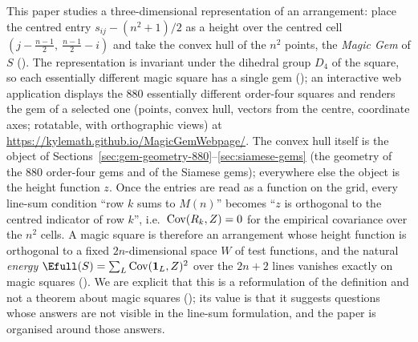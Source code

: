 This paper studies a three-dimensional representation of an arrangement: place the centred entry $s_{ij}-(n^2+1)/2$ as a height over the centred cell $(j-\frac{n-1}2,\ \frac{n-1}2-i)$ and take the convex hull of the $n^2$ points, the \emph{Magic Gem} of $S$ ().
The representation is invariant under the dihedral group $D_4$ of the square, so each essentially different magic square has a single gem (); an interactive web application displays the $880$ essentially different order-four squares and renders the gem of a selected one (points, convex hull, vectors from the centre, coordinate axes; rotatable, with orthographic views) at \url{https://kylemath.github.io/MagicGemWebpage/}.
The convex hull itself is the object of Sections~\ref{sec:gem-geometry-880}--\ref{sec:siamese-gems} (the geometry of the $880$ order-four gems and of the Siamese gems); everywhere else the object is the height function $z$.
Once the entries are read as a function on the grid, every line-sum condition ``row $k$ sums to $M(n)$'' becomes ``$z$ is orthogonal to the centred indicator of row $k$'', i.e.\ $\mathrm{Cov}(R_k,Z)=0$ for the empirical covariance over the $n^2$ cells.
A magic square is therefore an arrangement whose height function is orthogonal to a fixed $2n$-dimensional space $W$ of test functions, and the natural \emph{energy} $\Efull(S)=\sum_L\Cov(\mathbf 1_L,Z)^2$ over the $2n+2$ lines vanishes exactly on magic squares ().
We are explicit that this is a reformulation of the definition and not a theorem about magic squares (); its value is that it suggests questions whose answers are not visible in the line-sum formulation, and the paper is organised around those answers.

